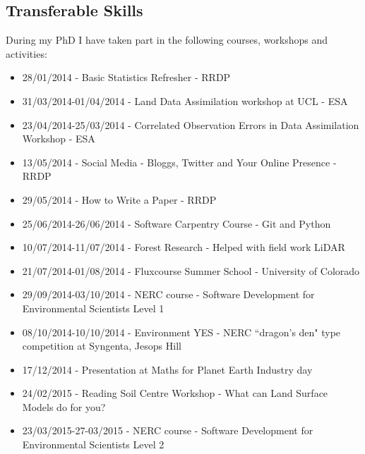 \documentclass[11pt]{article}
\begin{document}
\subsection{Transferable Skills}

During my PhD I have taken part in the following courses, workshops and activities:
\begin{itemize}
\item 28/01/2014 - Basic Statistics Refresher - RRDP

\item 31/03/2014-01/04/2014 - Land Data Assimilation workshop at UCL - ESA

\item 23/04/2014-25/03/2014 - Correlated Observation Errors in Data Assimilation Workshop - ESA

\item 13/05/2014 - Social Media - Bloggs, Twitter and Your Online Presence - RRDP

\item 29/05/2014 - How to Write a Paper - RRDP

\item 25/06/2014-26/06/2014 - Software Carpentry Course - Git and Python

\item 10/07/2014-11/07/2014 - Forest Research - Helped with field work LiDAR

\item  21/07/2014-01/08/2014 - Fluxcourse Summer School - University of Colorado

\item 29/09/2014-03/10/2014 - NERC course - Software Development for Environmental Scientists Level 1

\item 08/10/2014-10/10/2014 - Environment YES - NERC ``dragon's den" type competition at Syngenta, Jesops Hill

\item 17/12/2014 - Presentation at Maths for Planet Earth Industry day

\item 24/02/2015 - Reading Soil Centre Workshop - What can Land Surface Models do for you?

\item 23/03/2015-27-03/2015 - NERC course - Software Development for Environmental Scientists Level 2
\end{itemize}
\end{document}
